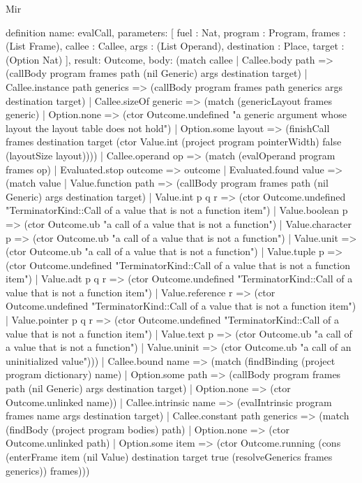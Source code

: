 \begin{lexlean}{Mir}
\begin{semanticmodule}
definition{
  name: evalCall,
  parameters: [
    fuel : Nat,
    program : Program,
    frames : (List Frame),
    callee : Callee,
    args : (List Operand),
    destination : Place,
    target : (Option Nat)
  ],
  result: Outcome,
  body: (match callee
    | Callee.body path => (callBody program frames path (nil Generic) args destination target)
    | Callee.instance path generics => (callBody program frames path generics args destination target)
    | Callee.sizeOf generic => (match (genericLayout frames generic)
      | Option.none => (ctor Outcome.undefined "a generic argument whose layout the layout table does not hold")
      | Option.some layout => (finishCall frames destination target (ctor Value.int (project program pointerWidth) false (layoutSize layout))))
    | Callee.operand op => (match (evalOperand program frames op)
      | Evaluated.stop outcome => outcome
      | Evaluated.found value => (match value
        | Value.function path => (callBody program frames path (nil Generic) args destination target)
        | Value.int p q r => (ctor Outcome.undefined "TerminatorKind::Call of a value that is not a function item")
        | Value.boolean p => (ctor Outcome.ub "a call of a value that is not a function")
        | Value.character p => (ctor Outcome.ub "a call of a value that is not a function")
        | Value.unit => (ctor Outcome.ub "a call of a value that is not a function")
        | Value.tuple p => (ctor Outcome.undefined "TerminatorKind::Call of a value that is not a function item")
        | Value.adt p q r => (ctor Outcome.undefined "TerminatorKind::Call of a value that is not a function item")
        | Value.reference r => (ctor Outcome.undefined "TerminatorKind::Call of a value that is not a function item")
        | Value.pointer p q r => (ctor Outcome.undefined "TerminatorKind::Call of a value that is not a function item")
        | Value.text p => (ctor Outcome.ub "a call of a value that is not a function")
        | Value.uninit => (ctor Outcome.ub "a call of an uninitialized value")))
    | Callee.bound name => (match (findBinding (project program dictionary) name)
      | Option.some path => (callBody program frames path (nil Generic) args destination target)
      | Option.none => (ctor Outcome.unlinked name))
    | Callee.intrinsic name => (evalIntrinsic program frames name args destination target)
    | Callee.constant path generics => (match (findBody (project program bodies) path)
      | Option.none => (ctor Outcome.unlinked path)
      | Option.some item => (ctor Outcome.running (cons (enterFrame item (nil Value) destination target true (resolveGenerics frames generics)) frames)))
}
\end{semanticmodule}
\end{lexlean}
